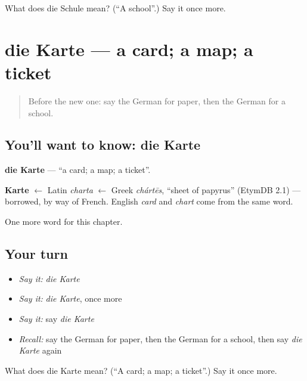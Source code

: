 \begin{tcolorbox}[breakable,colback=teal!4,colframe=teal!35!black,title={Before you move on}]
What does die Schule mean? (\textquotedblleft{}A school\textquotedblright{}.) Say it once more.
\end{tcolorbox}
\section[die Karte]{die Karte — a card; a map; a ticket}

\label{lesson:GE-C81-karte}



\begin{quote}
Before the new one: say the German for paper, then the German for a school.
\end{quote}

\subsection*{You'll want to know: die Karte}
\textbf{die Karte} — \textquotedblleft{}a card; a map; a ticket\textquotedblright{}.

\begin{cousinweb}
\textbf{Karte} $\leftarrow$ Latin \emph{charta} $\leftarrow$ Greek \emph{chártēs}, \textquotedblleft{}sheet of papyrus\textquotedblright{} (EtymDB 2.1) — borrowed, by way of French. English \emph{card} and \emph{chart} come from the same word.
\end{cousinweb}

\begin{grammarlens}[title={What you've built}]
One more word for this chapter.
\end{grammarlens}

\subsection*{Your turn}
\begin{itemize}
\raggedright
  \item \emph{Say it:} \emph{die Karte}
  \item \emph{Say it:} \emph{die Karte}, once more
  \item \emph{Say it:} say \emph{die Karte}
  \item \emph{Recall:} say the German for paper, then the German for a school, then say \emph{die Karte} again
\end{itemize}

\begin{tcolorbox}[breakable,colback=teal!4,colframe=teal!35!black,title={Before you move on}]
What does die Karte mean? (\textquotedblleft{}A card; a map; a ticket\textquotedblright{}.) Say it once more.
\end{tcolorbox}
